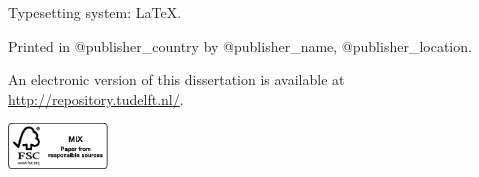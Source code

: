 \begin{titlepage}
\bigskip
\noindent
\begin{minipage}[c]{0.75\textwidth}

\noindent Typesetting system: \LaTeX.

\noindent Printed in @publisher\_country by @publisher\_name, @publisher\_location.

\medskip
\noindent An electronic version of this dissertation is available at \\
\url{http://repository.tudelft.nl/}.

\end{minipage}
\begin{minipage}[c]{0.25\textwidth}
\hfill \includegraphics[height=12mm]{title/logos/fsc}
\end{minipage}


\end{titlepage}
